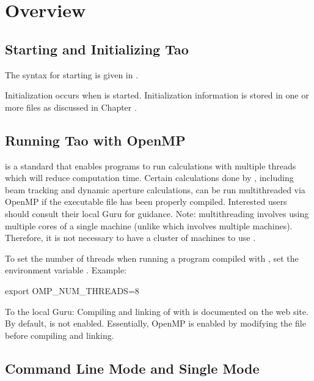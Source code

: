 \chapter{Overview}
\label{c:overview.tao}

\section{Starting and Initializing Tao}
\label{s:initializing}

The syntax for starting \tao is given in .

Initialization occurs when \tao is started. Initialization information is stored in one or more
files as discussed in Chapter .

\section{Running Tao with OpenMP}
\label{s:openmp}

 is a standard that enables programs to run calculations with multiple threads which will
reduce computation time. Certain calculations done by \tao, including beam tracking and dynamic
aperture calculations, can be run multithreaded via OpenMP if the \tao executable file has been
properly compiled.  Interested users should consult their local \bmad Guru for guidance. Note:
 multithreading involves using multiple cores of a single machine (unlike 
which involves multiple machines). Therefore, it is not necessary to have a cluster of machines to
use .

To set the number of threads when running a program compiled with , set the environment variable
. Example:
\begin{example}
  export OMP_NUM_THREADS=8
\end{example}

To the local \bmad Guru: Compiling and linking of \tao with  is documented on the \bmad
web site. By default,  is not enabled. Essentially, OpenMP is enabled by modifying
the  file before compiling and linking.

\section{Command Line Mode and Single Mode}
\label{s:modes}

